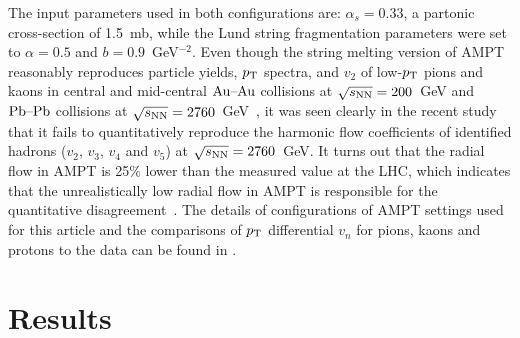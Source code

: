 \documentclass[ALICE,manyauthors]{cernphprep}
\begin{document}
The input parameters used in both configurations are: $\alpha_s = 0.33$, a partonic cross-section of 1.5~mb, while the Lund string fragmentation parameters were set to $\alpha = 0.5$ and $b = 0.9$~GeV$^{-2}$. 
Even though the string melting version of AMPT~\cite{Lin:2001zk,Lin:2004en} reasonably reproduces particle yields, $p_{\textnormal{T}}$ spectra, and $v_2$ of low-$p_{\textnormal{T}}$ pions and kaons in central and mid-central $\textnormal{Au--Au}$ collisions at $\sqrt{s_{\textnormal{NN}}}=200$~GeV and $\textnormal{Pb--Pb}$ collisions at $\sqrt{s_{\textnormal{NN}}}=2760$~GeV~\cite{Lin:2014tya}, it was seen clearly in the recent study~\cite{Adam:2016nfo} that it fails to quantitatively reproduce the harmonic flow coefficients of identified hadrons ($v_2$, $v_3$, $v_4$ and $v_5$) at $\sqrt{s_{\textnormal{NN}}}=2760$~GeV. It turns out that the radial flow in AMPT is 25\% lower than the measured value at the LHC, which indicates that the unrealistically low radial flow in AMPT is responsible for the quantitative disagreement~\cite{Adam:2016nfo}. The details of configurations of AMPT settings used for this article and the comparisons of $p_{\rm T}$ differential $v_{n}$ for pions, kaons and protons to the data can be found in \cite{Adam:2016nfo}.


% 

\section{Results}
\label{sec:results}
\end{document}
